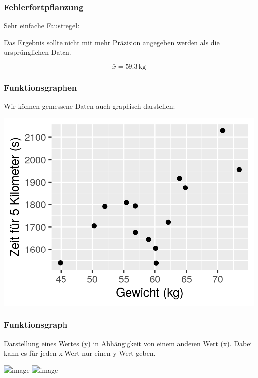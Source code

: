 \documentclass{beamer}
\begin{document}
\begin{frame}
\frametitle{Fehlerfortpflanzung}

Sehr einfache Faustregel:

Das Ergebnis sollte nicht mit mehr Präzision angegeben werden als die ursprünglichen Daten. 

\pause

\[
\bar{x} = 59.3\,\text{kg}
\]

\end{frame}



\begin{frame}
\frametitle{Funktionsgraphen}

Wir können  gemessene Daten auch graphisch darstellen:

\begin{center}
\includegraphics{zeit_vs_gewicht.png}
\end{center}

\end{frame}


\begin{frame}
\frametitle{Funktionsgraph}

Darstellung eines Wertes (y) in Abhängigkeit von einem anderen Wert (x). Dabei kann es für jeden x-Wert nur einen y-Wert geben. 

\begin{center}
\includegraphics<1>{zeit_vs_gewicht_regression.png}
\includegraphics<2>{function.png}
\end{center}

\end{frame}
\end{document}

